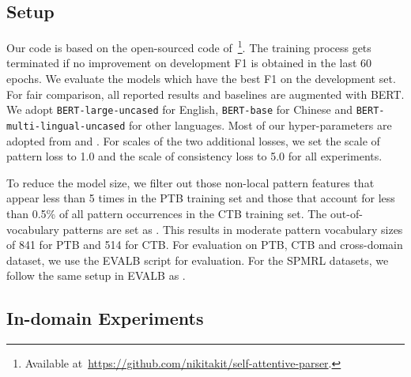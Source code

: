 \documentclass[11pt]{article}
\begin{document}
\subsection{Setup}
Our code is based on the open-sourced code of~\citet{san-constituency}\footnote{Available at~\url{https://github.com/nikitakit/self-attentive-parser}.}. 
The training process gets terminated if no improvement on development F1 is obtained in the last 60 epochs. 
We evaluate the models which have the best F1 on the development set. 
For fair comparison, all reported results and baselines are augmented with BERT. We adopt {\tt BERT-large-uncased} for English, {\tt BERT-base} for Chinese and {\tt BERT-multi-lingual-uncased} for other languages.
Most of our hyper-parameters are adopted from \citet{san-constituency} and \citet{cross-domain-parser}. 
For scales of the two additional losses, we set the scale of pattern loss to 1.0 and the scale of consistency loss to 5.0 for all experiments. 

To reduce the model size, we filter out those non-local pattern features that appear less than 5 times in the PTB training set and  those that account for less than 0.5\% of all pattern occurrences in the CTB training set. The out-of-vocabulary patterns are set as .
This results in moderate pattern vocabulary sizes of 841 for PTB and 514 for CTB. 
For evaluation on PTB, CTB and cross-domain dataset, we use the EVALB script for evaluation.
For the SPMRL datasets, we follow the same setup in EVALB as \citet{san-constituency}.



\subsection{In-domain Experiments}
\end{document}
